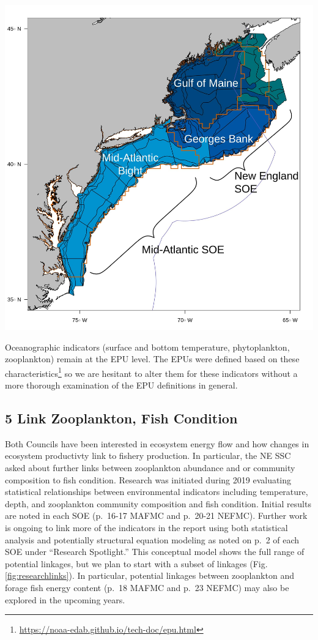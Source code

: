 \documentclass[
  10pt,
]{article}
\let\origfigure\figure
\let\endorigfigure\endfigure
\renewenvironment{figure}[1][2] {
    \expandafter\origfigure\expandafter[H]
} {
    \endorigfigure
}
\begin{document}
\begin{figure}

{\centering \includegraphics[width=0.8\linewidth]{images/EPU_Designations_Map} 

}

\caption{Survey strata mapping to EPUs for biomass estimates}\label{fig:survbio-strata}
\end{figure}

Oceanographic indicators (surface and bottom temperature, phytoplankton,
zooplankton) remain at the EPU level. The EPUs were defined based on
these characteristics\footnote{\url{https://noaa-edab.github.io/tech-doc/epu.html}}
so we are hesitant to alter them for these indicators without a more
thorough examination of the EPU definitions in general.

\hypertarget{link-zooplankton-fish-condition}{%
\subsection{5 Link Zooplankton, Fish
Condition}\label{link-zooplankton-fish-condition}}

Both Councils have been interested in ecosystem energy flow and how
changes in ecosystem productivty link to fishery production. In
particular, the NE SSC asked about further links between zooplankton
abundance and or community composition to fish condition. Research was
initiated during 2019 evaluating statistical relationships between
environmental indicators including temperature, depth, and zooplankton
community composition and fish condition. Initial results are noted in
each SOE (p.~16-17 MAFMC and p.~20-21 NEFMC). Further work is ongoing to
link more of the indicators in the report using both statistical
analysis and potentially structural equation modeling as noted on p.~2
of each SOE under ``Research Spotlight.'' This conceptual model shows
the full range of potential linkages, but we plan to start with a subset
of linkages (Fig. \ref{fig:researchlinks}). In particular, potential
linkages between zooplankton and forage fish energy content (p.~18 MAFMC
and p.~23 NEFMC) may also be explored in the upcoming years.
\end{document}
